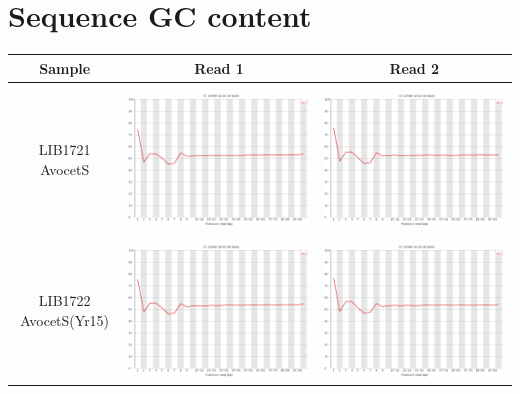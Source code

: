 \section{Sequence GC content}
 \label{App:AppendixQCGC}
\begin{center}
\begin{tabular}{ccc}
\toprule
Sample  & Read 1 & Read 2 \\ \midrule 
\\
\begin{sideways}LIB1721 AvocetS\end{sideways} & \includegraphics[width=0.4 \textwidth]{Appendices/images/Sample_LIB1721_base_gc_R1.png} & \includegraphics[width=0.4 \textwidth]{Appendices/images/Sample_LIB1721_base_gc_R2.png} \\ \midrule  \\
\begin{sideways}LIB1722 AvocetS(Yr15)\end{sideways} & \includegraphics[width=0.4 \textwidth]{Appendices/images/Sample_LIB1722_base_gc_R1.png} & \includegraphics[width=0.4 \textwidth]{Appendices/images/Sample_LIB1722_base_gc_R2.png} \\   

\end{tabular}
\end{center}
